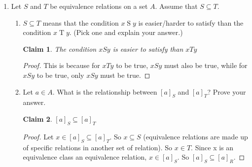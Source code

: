 \documentclass[11pt]{letter}
\newtheorem{claim}{Claim}
\theoremstyle{definition}
\begin{document}
\begin{description}
\begin{enumerate}
\begin{enumerate}
                                  
					\item Rewrite the claim in part (a) using the fraction notation introduced in problem 4. If $\frac{m}{n}=\frac{r}{s}$, then and $\frac{p}{q}=\frac{t}{s}$ then $\frac{mq+np}{nq}=\frac{rs+st}{s^2}$
				\end{enumerate}
			\item Let $S$ and $T$ be equivalence relations on a set $A$. Assume that $S\subseteq T$.
				\begin{enumerate}
				\item $S\subseteq T$ means that the condition $x \operatorname{S}y$ is easier/harder to satisfy than the condition $x \operatorname{T}y$. (Pick one and explain your answer.)
                                  \begin{claim}
                                    The condition $xSy$ is easier to satisfy than $xTy$
                                  \end{claim}
                                  \begin{proof}
                                    This is because for $xTy$ to be true, $xSy$ must also be true, while for $xSy$ to be true, only $xSy$ must be true.
                                  \end{proof}
                                  
                                  
				\item Let $a\in A$. What is the relationship between $[a]_S$ and $[a]_T$? Prove your answer.
                                  \begin{claim}
                                    $[a]_S\subseteq [a]_T$
                                  \end{claim}
                                  \begin{proof}
                                    Let $x\in [a]_S\subseteq [a]_T$. So $x\subseteq S$ (equivalence relations are made up of specific relations in another set of relation). So $x\in T$. Since x is an equivalence class an equivalence relation, $x\in [a]_S$. So $[a]_S\subseteq[a]_R$. 
                                  \end{proof}
                                  

\end{enumerate}
\end{enumerate}
\end{description}
\end{document}
